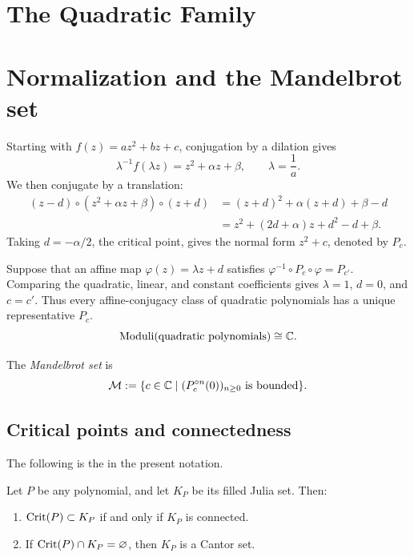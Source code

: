 \documentclass[11pt,a4paper]{article}
\begin{document}
\section*{The Quadratic Family}
\section{Normalization and the Mandelbrot set}
Starting with $f(z)=az^2+bz+c$, conjugation by a dilation gives
\[
\lambda^{-1}f(\lambda z)=z^2+\alpha z+\beta,
\qquad \lambda=\frac1a.
\]
We then conjugate by a translation:
\[
\begin{aligned}
(z-d)\circ(z^2+\alpha z+\beta)\circ(z+d)
 &=(z+d)^2+\alpha(z+d)+\beta-d\\
 &=z^2+(2d+\alpha)z+d^2-d+\beta.
\end{aligned}
\]
Taking $d=-\alpha/2$, the critical point, gives the normal form $z^2+c$, denoted by $P_c$.

Suppose that an affine map $\varphi(z)=\lambda z+d$ satisfies $\varphi^{-1}\circ P_c\circ\varphi=P_{c'}$. Comparing the quadratic, linear, and constant coefficients gives $\lambda=1$, $d=0$, and $c=c'$. Thus every affine-conjugacy class of quadratic polynomials has a unique representative $P_c$.
\[
\operatorname{Moduli}(\text{quadratic polynomials})\cong\mathbb{C}.
\]

\setcounter{definition}{0}\begin{definition}
The \emph{Mandelbrot set} is
\[
\mathcal M:=\{c\in\mathbb{C}\mid (P_c^{\circ n}(0))_{n\ge0}\text{ is bounded}\}.
\]
\end{definition}

\subsection{Critical points and connectedness}
The following is the  in the present notation.
\setcounter{theorem}{0}\begin{theorem}\label{thm:critical-connectedness}
Let $P$ be any polynomial, and let $K_P$ be its filled Julia set. Then:
\begin{enumerate}[label=(\roman*)]
\setcounter{enumi}{0}\item $\operatorname{Crit}(P)\subset K_P$ if and only if $K_P$ is connected.
\setcounter{enumi}{1}\item If $\operatorname{Crit}(P)\cap K_P=\varnothing$, then $K_P$ is a Cantor set.
\end{enumerate}
\end{theorem}
\end{document}
